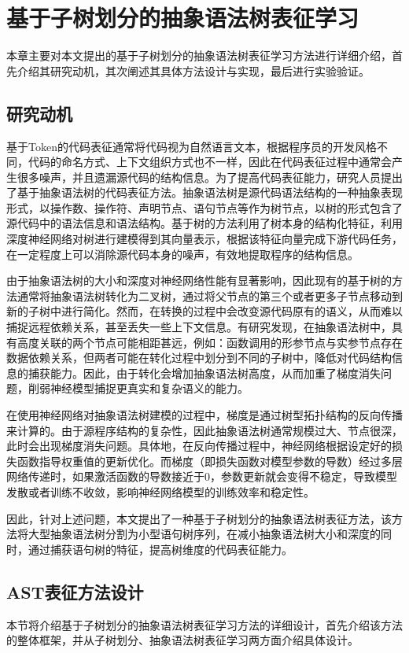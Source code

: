 \chapter{基于子树划分的抽象语法树表征学习}
\label{chap:AST}
本章主要对本文提出的基于子树划分的抽象语法树表征学习方法进行详细介绍，首先介绍其研究动机，其次阐述其具体方法设计与实现，最后进行实验验证。

\section{研究动机}
\label{sec:ASTMotivation}
基于Token的代码表征通常将代码视为自然语言文本，根据程序员的开发风格不同，代码的命名方式、上下文组织方式也不一样，因此在代码表征过程中通常会产生很多噪声，并且遗漏源代码的结构信息。为了提高代码表征能力，研究人员提出了基于抽象语法树的代码表征方法。抽象语法树是源代码语法结构的一种抽象表现形式，以操作数、操作符、声明节点、语句节点等作为树节点，以树的形式包含了源代码中的语法信息和语法结构。基于树的方法利用了树本身的结构化特征，利用深度神经网络对树进行建模得到其向量表示，根据该特征向量完成下游代码任务，在一定程度上可以消除源代码本身的噪声，有效地提取程序的结构信息。

由于抽象语法树的大小和深度对神经网络性能有显著影响，因此现有的基于树的方法通常将抽象语法树转化为二叉树，通过将父节点的第三个或者更多子节点移动到新的子树中进行简化。然而，在转换的过程中会改变源代码原有的语义，从而难以捕捉远程依赖关系，甚至丢失一些上下文信息。有研究发现\cite{Allamanis2017LearningTR}，在抽象语法树中，具有高度关联的两个节点可能相距甚远，例如：函数调用的形参节点与实参节点存在数据依赖关系，但两者可能在转化过程中划分到不同的子树中，降低对代码结构信息的捕获能力。因此，由于转化会增加抽象语法树高度，从而加重了梯度消失问题，削弱神经模型捕捉更真实和复杂语义的能力。

在使用神经网络对抽象语法树建模的过程中，梯度是通过树型拓扑结构的反向传播来计算的。由于源程序结构的复杂性，因此抽象语法树通常规模过大、节点很深，此时会出现梯度消失问题。具体地，在反向传播过程中，神经网络根据设定好的损失函数指导权重值的更新优化。而梯度（即损失函数对模型参数的导数）经过多层网络传递时，如果激活函数的导数接近于0，参数更新就会变得不稳定，导致模型发散或者训练不收敛，影响神经网络模型的训练效率和稳定性。

因此，针对上述问题，本文提出了一种基于子树划分的抽象语法树表征方法，该方法将大型抽象语法树分割为小型语句树序列，在减小抽象语法树大小和深度的同时，通过捕获语句树的特征，提高树维度的代码表征能力。

\section{AST表征方法设计}
\label{sec:AST}
本节将介绍基于子树划分的抽象语法树表征学习方法的详细设计，首先介绍该方法的整体框架，并从子树划分、抽象语法树表征学习两方面介绍具体设计。 

